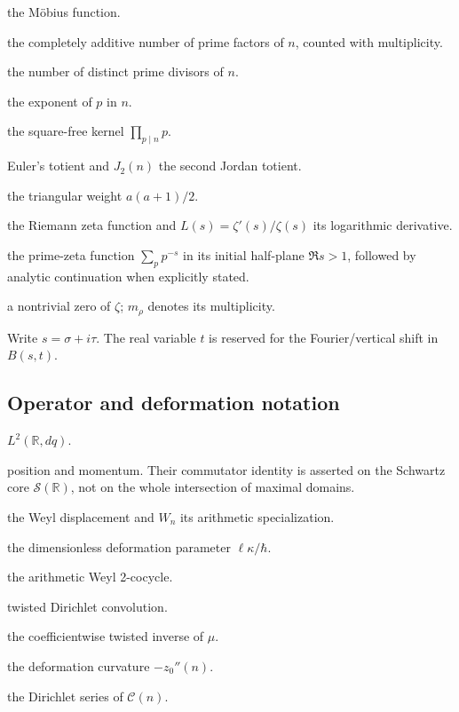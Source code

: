 \documentclass[11pt]{amsart}
\numberwithin{equation}{section}
\theoremstyle{plain}
\theoremstyle{definition}
\theoremstyle{remark}
\newcommand{\Hil}{\mathcal{H}}
\newcommand{\Sch}{\mathcal{S}}
\begin{document}
\begin{description}[leftmargin=3.2cm,style=nextline]
\item[\(\mu(n)\)] the M\"obius function.
\item[\(\Omega(n)\)] the completely additive number of prime factors of
\(n\), counted with multiplicity.
\item[\(\omega(n)\)] the number of distinct prime divisors of \(n\).
\item[\(v_p(n)\)] the exponent of \(p\) in \(n\).
\item[\(\operatorname{rad}(n)\)] the square-free kernel
\(\prod_{p\mid n}p\).
\item[\(\varphi(n)\)] Euler's totient and \(J_2(n)\) the second Jordan
totient.
\item[\(T(a)\)] the triangular weight \(a(a+1)/2\).
\item[\(\zeta(s)\)] the Riemann zeta function and
\(L(s)=\zeta'(s)/\zeta(s)\) its logarithmic derivative.
\item[\(P(s)\)] the prime-zeta function \(\sum_p p^{-s}\) in its initial
half-plane \(\Re s>1\), followed by analytic continuation when explicitly
stated.
\item[\(\rho\)] a nontrivial zero of \(\zeta\); \(m_\rho\) denotes its
multiplicity.
\item[\(s,t\)] Write \(s=\sigma+i\tau\).  The real variable \(t\) is reserved for the
Fourier/vertical shift in \(B(s,t)\).
\end{description}

\subsection{Operator and deformation notation}
\label{subsec:notation_operator}

\begin{description}[leftmargin=3.2cm,style=nextline]
\item[\(\Hil\)] \(L^2(\mathbb R,dq)\).
\item[\(Q,P\)] position and momentum.  Their commutator identity is asserted
on the Schwartz core \(\Sch(\mathbb R)\), not on the whole intersection of
maximal domains.
\item[\(W(x,y)\)] the Weyl displacement and \(W_n\) its arithmetic
specialization.
\item[\(\vartheta\)] the dimensionless deformation parameter
\(\ell\kappa/\hbar\).
\item[\(\chi_\vartheta(m,n)\)] the arithmetic Weyl 2-cocycle.
\item[\(\star_\vartheta\)] twisted Dirichlet convolution.
\item[\(z_\vartheta(n)\)] the coefficientwise twisted inverse of \(\mu\).
\item[\(\mathcal C(n)\)] the deformation curvature \(-z_0''(n)\).
\item[\(\mathcal K(s)\)] the Dirichlet series of \(\mathcal C(n)\).
\end{description}
\end{document}
